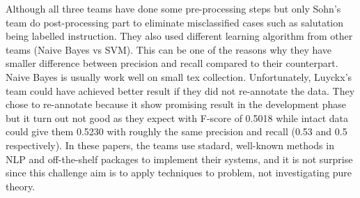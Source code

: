 \iffalse
  The differences between these systems are summarized in Table 1.\\
\fi
Although all three teams have done some pre-processing steps but only Sohn’s team do post-processing part to eliminate misclassified cases such as salutation being labelled instruction. They also used different learning algorithm from other teams (Naive Bayes vs SVM). This can be one of the reasons why they have smaller difference between precision and recall compared to their counterpart. Naive Bayes is usually work well on small tex collection. Unfortunately, Luyckx’s team could have achieved better result if they did not re-annotate the data. They chose to re-annotate because it show promising result in the development phase but it turn out not good as they expect with F-score of 0.5018 while intact data could give them 0.5230 with roughly the same precision and recall (0.53 and 0.5 respectively). In these papers, the teams use stadard, well-known methods in NLP and off-the-shelf packages to implement their systems, and it is not surprise since this challenge aim is to apply techniques to problem, not investigating pure theory.



